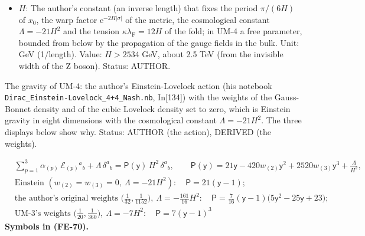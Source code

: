 \documentclass[
  10pt,
]{article}
\begin{document}
\begin{itemize}
  \((1, 1/32, 1/1152)\). Status: AUTHOR (the form), DERIVED (the values
  that the order of 2026-10-25 selects).
\item
  \(H\): The author's constant (an inverse length) that fixes the period
  \(\pi/(6H)\) of \(x_0\), the warp factor
  \(\mathrm{e}^{-2H\lvert\sigma\rvert}\) of the metric, the cosmological
  constant \(\Lambda = -21H^2\) and the tension
  \(\kappa\lambda_{\mathrm{F}} = 12H\) of the fold; in UM-4 a free
  parameter, bounded from below by the propagation of the gauge fields
  in the bulk. Unit: GeV (1/length). Value: \(H > 2534\) GeV, about 2.5
  TeV (from the invisible width of the Z boson). Status: AUTHOR.
\end{itemize}

The gravity of UM-4: the author's Einstein-Lovelock action (his notebook
\texttt{Dirac\_Einstein-Lovelock\_4+4\_Nash.nb}, In{[}134{]}) with the
weights of the Gauss-Bonnet density and of the cubic Lovelock density
set to zero, which is Einstein gravity in eight dimensions with the
cosmological constant \(\Lambda = -21H^2\). The three displays below
show why. Status: AUTHOR (the action), DERIVED (the weights).

\[
\begin{aligned}
&\sum_{p=1}^{3}\alpha_{(p)}\,\mathcal{E}_{(p)}{}^a{}_b + \Lambda\,\delta^a{}_b = \mathsf{P}(\mathsf{y})\,H^2\,\delta^a{}_b,\qquad
 \mathsf{P}(\mathsf{y}) = 21\mathsf{y} - 420w_{(2)}\mathsf{y}^2 + 2520w_{(3)}\mathsf{y}^3 + \frac{\Lambda}{H^2},\\
&\text{Einstein } (w_{(2)} = w_{(3)} = 0,\ \Lambda = -21H^2):\quad \mathsf{P} = 21(\mathsf{y} - 1);\\
&\text{the author's original weights } \Big(\frac{1}{32}, \frac{1}{1152}\Big),\ \Lambda = -\frac{161}{16}H^2:\quad
 \mathsf{P} = \frac{7}{16}(\mathsf{y} - 1)\big(5\mathsf{y}^2 - 25\mathsf{y} + 23\big);\\
&\text{UM-3's weights } \Big(\frac{1}{20}, \frac{1}{360}\Big),\ \Lambda = -7H^2:\quad \mathsf{P} = 7(\mathsf{y} - 1)^3
\end{aligned} \tag{FE-70}
\] \textbf{Symbols in (FE-70).}
\end{document}
